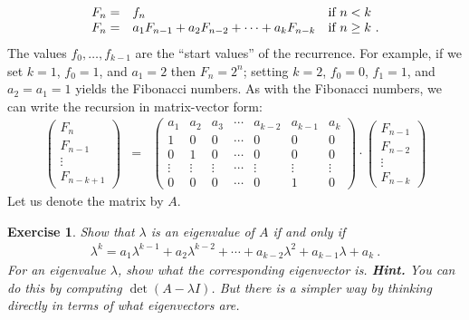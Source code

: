 \documentclass[12pt,a4]{article}
\newtheorem{exercise}[theorem]{Exercise}
\begin{document}
\begin{align*}
\begin{array}{lll}
    F_n  = &  f_n & \textnormal{if $n < k$} \\
    F_n =  &a_1 F_{n-1} + a_2 F_{n-2} + \cdots + a_k F_{n-k} &  \textnormal{if $n \geq k$}\ .
    \end{array}
\end{align*}
The values $f_0, \dots, f_{k-1}$ are the ``start values'' of the recurrence. For example, if we set $k=1$, $f_0=1$, and
$a_1 = 2$ then $F_n = 2^n$; setting $k=2$, $f_0=0$, $f_1=1$, and $a_2 = a_1 = 1$ yields the Fibonacci numbers.
As with the Fibonacci numbers, we can write the recursion in matrix-vector form:
\begin{align*}
    \begin{pmatrix} F_n \\ F_{n-1} \\ \vdots \\ F_{n-k+1}\end{pmatrix} &  =
    &
    \begin{pmatrix} a_1 & a_2 & a_3 & \cdots & a_{k-2} & a_{k-1} &  a_k \\
                                 1 & 0     &  0 & \cdots &0 &  0 & 0\\
                                  0 & 1    & 0 & \cdots &0 & 0& 0\\
                                  \vdots   & \vdots      &  \vdots & \cdots &\vdots &  \vdots & \vdots \\
                                  0  & 0  & 0  & \cdots & 0 & 1 & 0 
    \end{pmatrix} \cdot
     \begin{pmatrix}
     F_{n-1} \\ F_{n-2} \\ \vdots \\ F_{n-k}
     \end{pmatrix}
\end{align*}
Let us denote the matrix by $A$. 
\begin{exercise}
     Show that $\lambda$ is an eigenvalue of $A$ if and only if 
     \begin{align}
     \lambda^k = a_1  \lambda^{k-1} +a_2  \lambda^{k-2} + \cdots + a_{k-2} \lambda^2 + a_{k-1} \lambda + a_k \ . 
     \label{charpol}
     \end{align}
     For an eigenvalue $\lambda$, show what the corresponding eigenvector is.
     \textbf{Hint.} You can do this by computing $\det(A- \lambda I)$. But there is a simpler way by thinking
     directly in terms of what eigenvectors are.
\end{exercise}
\end{document}

